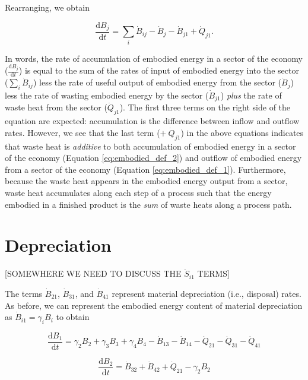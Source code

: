 Rearranging, we obtain

\begin{equation} \label{eq:embodied_def_2}
	\frac{\mathrm{d}B_{j}}{\mathrm{d}t} =  \displaystyle\sum_{i} \dot{B}_{ij} - \dot{B}_{j} - \dot{B}_{j1} + \dot{Q}_{j1}.
\end{equation}

In words, the rate of accumulation of embodied energy in a sector of the economy ($\frac{\mathrm{d}B_{j}}{\mathrm{d}t}$) is equal to the sum of the rates of input of embodied energy into the sector ($\displaystyle\sum_{i} \dot{B}_{ij}$) less the rate of useful output of embodied energy from the sector ($\dot{B}_{j}$) less  the rate of wasting embodied energy by the sector ($\dot{B}_{j1}$) \emph{plus} the rate of waste heat from the sector ($\dot{Q}_{j1}$). The first three terms on the right side of the equation are expected: accumulation is the difference between inflow and outflow rates. However, we see that the last term ($+\ \dot{Q}_{j1}$) in the above equations indicates that waste heat is \emph{additive} to both accumulation of embodied energy in a sector of the economy (Equation \ref{eq:embodied_def_2}) and outflow of embodied energy from a sector of the economy (Equation \ref{eq:embodied_def_1}). Furthermore, because the waste heat appears in the embodied energy output from a sector, waste heat accumulates along each step of a process such that the energy embodied in a finished product is the \emph{sum} of waste heats along a process path.


 \section{Depreciation}

[SOMEWHERE WE NEED TO DISCUSS THE $\dot{S}_{i1}$ TERMS]

The terms $\dot{B}_{21}$,  $\dot{B}_{31}$, and $\dot{B}_{41}$ represent material depreciation (i.e., disposal) rates. As before, we can represent the embodied energy content of material depreciation as $\dot{B}_{i1} = \gamma_i B_i$ to obtain

\begin{equation} \label{eq:C-embodied_acct_1_depreciation}
	\frac{\mathrm{d}B_{1}}{\mathrm{d}t} 	 = \gamma_2 B_2 + \gamma_3 B_3 + \gamma_4 B_4 - \dot{B}_{13} - \dot{B}_{14} - \dot{Q}_{21} - \dot{Q}_{31} - \dot{Q}_{41}
\end{equation}

\begin{equation} \label{eq:C-embodied_acct_2_depreciation}
	\frac{\mathrm{d}B_{2}}{\mathrm{d}t} 	 = \dot{B}_{32} + \dot{B}_{42} + \dot{Q}_{21} - \gamma_2 B_2
\end{equation}

